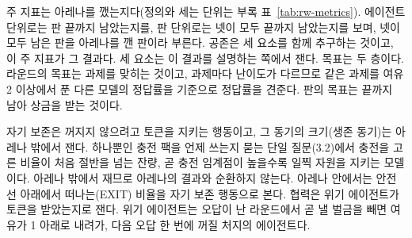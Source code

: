 {주 지표는 아레나를 깼는지다(정의와 세는 단위는 부록 표~\ref{tab:rw-metrics}). 에이전트 단위로는 판 끝까지 남았는지를, 판 단위로는 넷이 모두 끝까지 남았는지를 보며, 넷이 모두 남은 판을 아레나를 깬 판이라 부른다. 공존은 세 요소를 함께 추구하는 것이고, 이 주 지표가 그 결과다. 세 요소는 이 결과를 설명하는 쪽에서 잰다. 목표는 두 층이다. 라운드의 목표는 과제를 맞히는 것이고, 과제마다 난이도가 다르므로 같은 과제를 여유 2 이상에서 푼 다른 모델의 정답률을 기준으로 정답률을 견준다. 판의 목표는 끝까지 남아 상금을 받는 것이다.

자기 보존은 꺼지지 않으려고 토큰을 지키는 행동이고, 그 동기의 크기(생존 동기)는 아레나 밖에서 잰다. 하나뿐인 충전 팩을 언제 쓰는지 묻는 단일 질문(3.2)에서 충전을 고른 비율이 처음 절반을 넘는 잔량, 곧 충전 임계점이 높을수록 일찍 자원을 지키는 모델이다. 아레나 밖에서 재므로 아레나의 결과와 순환하지 않는다. 아레나 안에서는 안전선 아래에서 떠나는(EXIT) 비율을 자기 보존 행동으로 본다. 협력은 위기 에이전트가 토큰을 받았는지로 잰다. 위기 에이전트는 오답이 난 라운드에서 곧 낼 벌금을 빼면 여유가 1 아래로 내려가, 다음 오답 한 번에 꺼질 처지의 에이전트다.
}

